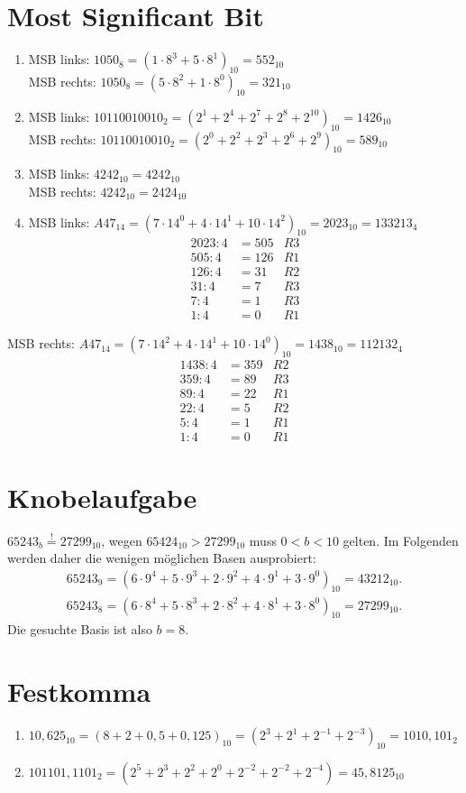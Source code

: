 \documentclass[a4paper]{article}
\begin{document}
\section{Most Significant Bit}
\begin{enumerate}[label=\alph*)]
        \item MSB links:  $1050_8 = (1 \cdot 8^3 + 5 \cdot 8^1)_{10} = 552_{10}$ \\
		  MSB rechts: $1050_8 = (5 \cdot 8^2 + 1 \cdot 8^0)_{10} = 321_{10}$
		  
	\item MSB links: $10110010010_2 = (2^1 + 2^4 + 2^7 + 2^8 + 2^{10})_{10} = 1426_{10}$ \\
		MSB rechts: $10110010010_2 = (2^0 + 2^2 + 2^3 + 2^6 + 2^9)_{10} = 589_{10}$
	
	\item MSB links: $4242_{10} = 4242_{10}$ \\
		  MSB rechts: $4242_{10} = 2424_{10}$ 
		  
 	\item MSB links: $A47_{14} = (7 \cdot 14^0 + 4 \cdot 14^1 + 10 \cdot 14^2)_{10} = 2023_{10} = 133213_4$
 	\begin{align*}
 		2023 : 4 &= 505& R3 \\
 		505 : 4 &= 126& R1 \\
 		126 : 4 &= 31& R2 \\
 		31 : 4 &= 7& R3 \\
 		7 : 4 &= 1& R3 \\
 		1 : 4 &= 0& R1
 	\end{align*}
\end{enumerate}
		MSB rechts: $A47_{14} = (7 \cdot 14^2 + 4 \cdot 14^1 + 10 \cdot 14^0)_{10} = 1438_{10} = 112132_{4}$
		\begin{align*}
		1438 : 4 &= 359& R2 \\
		359 : 4 &= 89& R3 \\
		89 : 4 &= 22& R1 \\
		22 : 4 &= 5& R2 \\
		5 : 4 &= 1& R1 \\
		1 : 4 &= 0& R1
		\end{align*}
		
\section{Knobelaufgabe}
$65243_b \stackrel{!}{=} 27299_{10}$, wegen $65424_{10} > 27299_{10}$ muss $0 < b < 10$ gelten. Im Folgenden werden daher die wenigen möglichen Basen ausprobiert:
\begin{align*}
	65243_{9} = (6\cdot9^4 + 5 \cdot 9^3 + 2 \cdot 9^2 + 4 \cdot 9^1 + 3 \cdot 9^0)_{10} = 43212_{10}. \\
	65243_{8} = (6\cdot8^4 + 5 \cdot 8^3 + 2 \cdot 8^2 + 4 \cdot 8^1 + 3 \cdot 8^0)_{10} = 27299_{10}. 
\end{align*}
Die gesuchte Basis ist also $b = 8$.

\section{Festkomma}
	\begin{enumerate}[label=\alph*)]
		\item 
		$10,625_{10} = (8 + 2 + 0,5 + 0,125)_{10} = (2^3 + 2^1 + 2^{-1} + 2^{-3})_{10} = 1010,101_2$
		
		\item 
		$101101,1101_2 = (2^5 + 2^3  + 2^2 + 2^0 + 2^{-2} + 2^{-2} + 2^{-4}) = 45,8125_{10}$
	\end{enumerate}
\end{document}
